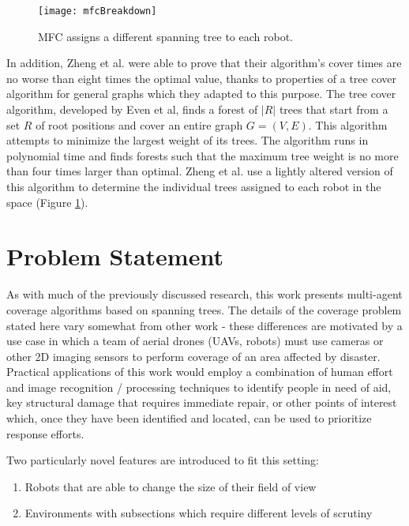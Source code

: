 \begin{figure}[H]
\texttt{[image: mfcBreakdown]}
\caption[Multi-Robot Forest Coverage Path Creation]{MFC assigns a different spanning tree to each robot.}
\label {fig:MRCPaths}
\end{figure}

In addition, Zheng et al. were able to prove that their algorithm's cover times are no worse than eight times the optimal value, thanks to properties of a tree cover algorithm for general graphs which they adapted to this purpose. The tree cover algorithm, developed by Even et al, finds a forest of $|R|$ trees that start from a set $R$ of root positions and cover an entire graph $G = (V, E)$. This algorithm attempts to minimize the largest weight of its trees. The algorithm runs in polynomial time and finds forests such that the maximum tree weight is no more than four times larger than optimal. Zheng et al. use a lightly altered version of this algorithm to determine the individual trees assigned to each robot in the space (Figure \ref{fig:MRCPaths}). 

\section{Problem Statement}

As with much of the previously discussed research, this work presents multi-agent coverage algorithms based on spanning trees. The details of the coverage problem stated here vary somewhat from other work - these differences are motivated by a use case in which a team of aerial drones (UAVs, robots) must use cameras or other 2D imaging sensors to perform coverage of an area affected by disaster. Practical applications of this work would employ a combination of human effort and image recognition / processing techniques to identify people in need of aid, key structural damage that requires immediate repair, or other points of interest which, once they have been identified and located, can be used to prioritize response efforts.

Two particularly novel features are introduced to fit this setting:
\begin{enumerate}
	\item Robots that are able to change the size of their field of view
	\item Environments with subsections which require different levels of scrutiny
\end{enumerate}

